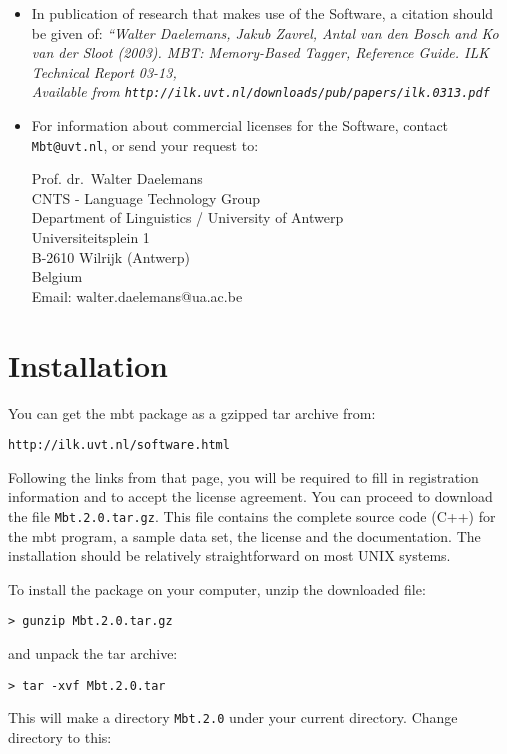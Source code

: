 \documentclass{report}
\begin{document}
\begin{itemize}
\item In publication of research that makes use of the Software, a
citation should be given of: {\em ``Walter Daelemans, Jakub Zavrel,
Antal van den Bosch and Ko van der Sloot (2003). MBT: Memory-Based
Tagger, Reference Guide. ILK Technical Report 03-13, \\
Available from
{\tt http://ilk.uvt.nl/downloads/pub/papers/ilk.0313.pdf}}

\item For information about commercial licenses for the Software,
contact {\tt Mbt@uvt.nl}, or send your request to:

Prof. dr.~Walter Daelemans\\
CNTS - Language Technology Group\\
Department of Linguistics / University of Antwerp\\
Universiteitsplein 1\\
B-2610 Wilrijk (Antwerp)\\
Belgium\\
Email: walter.daelemans@ua.ac.be

\end{itemize}

\pagestyle{headings}

\chapter{Installation}
\vspace{-1cm}
You can get the {\sc mbt} package as a gzipped tar archive from:

{\tt http://ilk.uvt.nl/software.html}

Following the links from that page, you will be required to fill in
registration information and to accept the license agreement. You can
proceed to download the file {\tt Mbt.2.0.tar.gz}. This file contains
the complete source code (C++) for the {\sc mbt} program, a sample
data set, the license and the documentation. The installation should
be relatively straightforward on most UNIX systems.

To install the package on your computer, unzip the downloaded file:

{\tt > gunzip Mbt.2.0.tar.gz}

and unpack the tar archive:

{\tt > tar -xvf Mbt.2.0.tar}

This will make a directory {\tt Mbt.2.0} under your 
current directory. Change directory to this:
\end{document}
